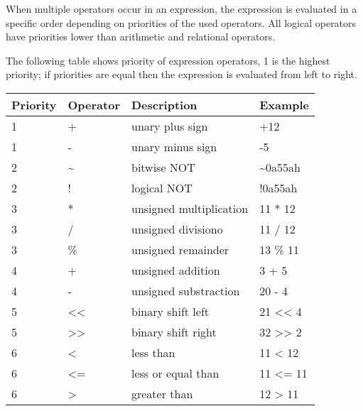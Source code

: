         When multiple operators occur in an expression, the expression is evaluated in a specific order depending on priorities of the used operators. All logical operators have priorities lower than arithmetic and relational operators.

        The following table shows priority of expression operators, 1 is the highest priority; if priorities are equal then the expression is evaluated from left to right.

        \begin{table}[h!]
            \centering{}
            \mysmallfont{}

            \begin{tabular}{|l|l|l|l|}
                \hline
                Priority & Operator & Description             & Example         \\\hline
                1        & +        & unary plus sign         & +12             \\\hline
                1        & -        & unary minus sign        & -5              \\\hline
                2        & \~{}     & bitwise NOT             & \~{}0a55ah      \\\hline
                2        & !        & logical NOT             & !0a55ah         \\\hline
                3        & *        & unsigned multiplication & 11 * 12         \\\hline
                3        & /        & unsigned divisiono      & 11 / 12         \\\hline
                3        & \%       & unsigned remainder      & 13 \% 11        \\\hline
                4        & +        & unsigned addition       & 3 + 5           \\\hline
                4        & -        & unsigned substraction   & 20 - 4          \\\hline
                5        & <{}<     & binary shift left       & 21 <{}< 4       \\\hline
                5        & >{}>     & binary shift right      & 32 >{}> 2       \\\hline
                6        & <        & less than               & 11 < 12         \\\hline
                6        & <=       & less or equal than      & 11 <= 11        \\\hline
                6        &  >       & greater than            & 12 > 11         \\\hline

\end{tabular}
\end{table}
